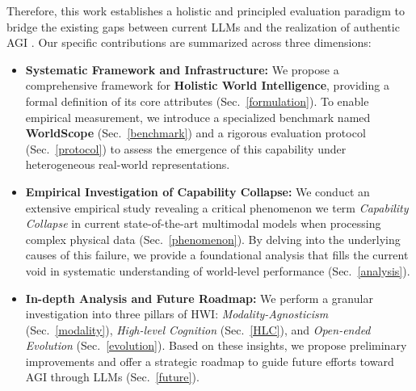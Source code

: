 Therefore, this work establishes a holistic and principled evaluation paradigm to bridge the existing gaps between current LLMs and the realization of authentic AGI \cite{mahowald2024dissociating}. Our specific contributions are summarized across three dimensions:
\begin{itemize}[leftmargin=*]
\item \textbf{Systematic Framework and Infrastructure:} We propose a comprehensive framework for \textbf{Holistic World Intelligence}, providing a formal definition of its core attributes (Sec.~\ref{formulation}). To enable empirical measurement, we introduce a specialized benchmark named \textbf{WorldScope} (Sec.~\ref{benchmark}) and a rigorous evaluation protocol (Sec.~\ref{protocol}) to assess the emergence of this capability under heterogeneous real-world representations.
\item \textbf{Empirical Investigation of Capability Collapse:} We conduct an extensive empirical study revealing a critical phenomenon we term \emph{Capability Collapse} in current state-of-the-art multimodal models when processing complex physical data (Sec.~\ref{phenomenon}). By delving into the underlying causes of this failure, we provide a foundational analysis that fills the current void in systematic understanding of world-level performance (Sec.~\ref{analysis}).
\item \textbf{In-depth Analysis and Future Roadmap:} We perform a granular investigation into three pillars of HWI: \emph{Modality-Agnosticism} (Sec.~\ref{modality}), \emph{High-level Cognition} (Sec.~\ref{HLC}), and \emph{Open-ended Evolution} (Sec.~\ref{evolution}). Based on these insights, we propose preliminary improvements and offer a strategic roadmap to guide future efforts toward AGI through LLMs (Sec.~\ref{future}).
\end{itemize}
